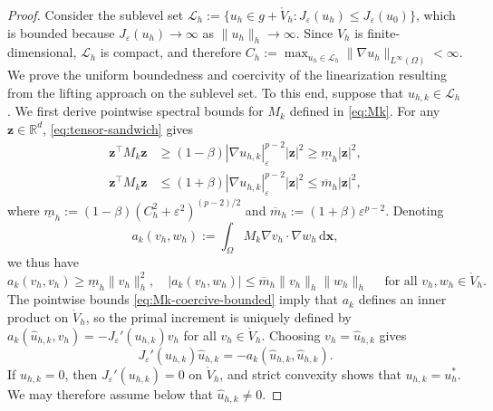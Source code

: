 \documentclass[10pt,a4paper]{amsart}
\newcommand{\bs}[1]{\ensuremath{\boldsymbol{#1}}}
\begin{document}
\begin{proof}
Consider the sublevel set
$\mathcal L_h:=\{u_h\in g+\mathring{V}_h:J_\varepsilon(u_h)\le J_\varepsilon(u_0)\}$, which is bounded because
$J_\varepsilon(u_h)\to \infty$ as $\|u_h\|_h\to \infty$. %
Since $V_h$ is finite-dimensional, $\mathcal{L}_h$ is compact, and therefore
$ C_h:=\max_{u_h\in\mathcal L_h}\|\nabla u_h\|_{L^\infty(\Omega)}<\infty$.
We prove the uniform boundedness and coercivity of the linearization resulting from the lifting approach on the sublevel set. To this end, suppose that $u_{h,k}\in\mathcal L_h$.
We first derive pointwise spectral bounds for $M_k$ defined in \eqref{eq:Mk}. For any $\bs z\in\mathbb R^d$,
\eqref{eq:tensor-sandwich} gives
\begin{equation}\label{eq:spectral-lower-upper}
  \begin{aligned}
    \bs z^\top M_k \bs z
    &\geq (1-\beta)|\nabla u_{h,k}|_\varepsilon^{p-2}|\bs z|^2
    \geq \underline m_h
    |\bs z|^2,\\
  \bs z^\top M_k \bs z&\leq (1+\beta)|\nabla u_{h,k}|_\varepsilon^{p-2}|\bs z|^2\leq
  \overline m_h |\bs z|^2,
  \end{aligned}
\end{equation}
where $\underline m_h:=(1-\beta)(C_h^2+\varepsilon^2)^{(p-2)/2}$ and  $\overline m_h:=(1+\beta)\varepsilon^{p-2}$.
Denoting
\begin{equation*}
  a_k(v_h,w_h):=\int_\Omega M_k\nabla v_h\cdot\nabla w_h\,\mathrm{d}\bs x,
\end{equation*}
we thus have
\begin{equation}\label{eq:Mk-coercive-bounded}
  a_k(v_h,v_h)\geq \underline m_h\|v_h\|_h^2, \quad |a_k(v_h,w_h)| \leq \overline m_h\|v_h\|_h\|w_h\|_h \quad\text{ for all } v_h,w_h\in\mathring{V}_h.
\end{equation}
The pointwise bounds \eqref{eq:Mk-coercive-bounded} imply that $a_k$ defines an inner product on $\mathring V_h$, so the primal increment is uniquely defined by $a_k(\hat u_{h,k},v_h)=-J_\varepsilon'(u_{h,k})v_h$ for all $v_h\in\mathring V_h$. Choosing $v_h=\hat u_{h,k}$ gives
\begin{equation}\label{eq:direct-descent-identity}
  J_\varepsilon'(u_{h,k})\hat u_{h,k}
  =-a_k(\hat u_{h,k},\hat u_{h,k}).
\end{equation}
If $\hat u_{h,k}=0$, then $J_\varepsilon'(u_{h,k})=0$ on
$\mathring V_h$, and strict convexity shows that $u_{h,k}=u_h^*$.  We may
therefore assume below that $\hat u_{h,k}\neq0$.


\end{proof}
\end{document}
